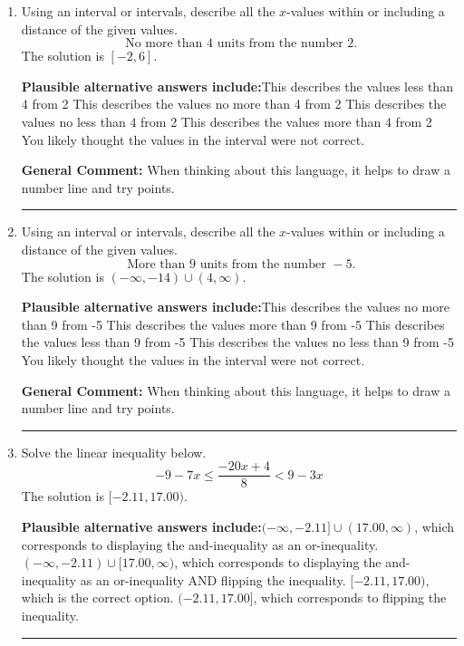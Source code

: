 \documentclass{extbook}[14pt]
\newcommand{\litem}[1]{\item #1

\rule{\textwidth}{0.4pt}}
\begin{document}
\begin{enumerate}
{\textbf{General Comment:} Remember that less/greater than or equal to includes the endpoint, while less/greater do not. Also, remember that you need to flip the inequality when you multiply or divide by a negative.
}
\litem{
Using an interval or intervals, describe all the $x$-values within or including a distance of the given values.
\[ \text{ No more than } 4 \text{ units from the number } 2. \]The solution is \( [-2, 6] \).\begin{enumerate}[label=\Alph*.]
\textbf{Plausible alternative answers include:}This describes the values less than 4 from 2
This describes the values no more than 4 from 2
This describes the values no less than 4 from 2
This describes the values more than 4 from 2
You likely thought the values in the interval were not correct.
\end{enumerate}

\textbf{General Comment:} When thinking about this language, it helps to draw a number line and try points.
}
\litem{
Using an interval or intervals, describe all the $x$-values within or including a distance of the given values.
\[ \text{ More than } 9 \text{ units from the number } -5. \]The solution is \( (-\infty, -14) \cup (4, \infty) \).\begin{enumerate}[label=\Alph*.]
\textbf{Plausible alternative answers include:}This describes the values no more than 9 from -5
This describes the values more than 9 from -5
This describes the values less than 9 from -5
This describes the values no less than 9 from -5
You likely thought the values in the interval were not correct.
\end{enumerate}

\textbf{General Comment:} When thinking about this language, it helps to draw a number line and try points.
}
\litem{
Solve the linear inequality below.
\[ -9 - 7 x \leq \frac{-20 x + 4}{8} < 9 - 3 x \]The solution is \( [-2.11, 17.00) \).\begin{enumerate}[label=\Alph*.]
\textbf{Plausible alternative answers include:}$(-\infty, -2.11] \cup (17.00, \infty)$, which corresponds to displaying the and-inequality as an or-inequality.
$(-\infty, -2.11) \cup [17.00, \infty)$, which corresponds to displaying the and-inequality as an or-inequality AND flipping the inequality.
$[-2.11, 17.00)$, which is the correct option.
$(-2.11, 17.00]$, which corresponds to flipping the inequality.

\end{enumerate}

}
\end{enumerate}
\end{document}

